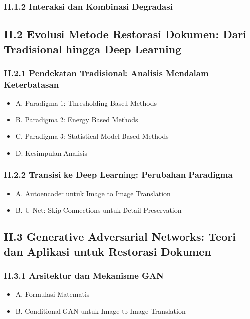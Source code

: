 \documentclass[11pt,a4paper]{article}
\begin{document}
\subsubsection*{II.1.2 Interaksi dan Kombinasi Degradasi}

\vspace{0.5em}

\subsection*{II.2 Evolusi Metode Restorasi Dokumen: Dari Tradisional hingga Deep Learning}

\subsubsection*{II.2.1 Pendekatan Tradisional: Analisis Mendalam Keterbatasan}
\begin{itemize}[label={}, leftmargin=2em]
    \item A. Paradigma 1: Thresholding Based Methods
    \item B. Paradigma 2: Energy Based Methods
    \item C. Paradigma 3: Statistical Model Based Methods
    \item D. Kesimpulan Analisis
\end{itemize}

\subsubsection*{II.2.2 Transisi ke Deep Learning: Perubahan Paradigma}
\begin{itemize}[label={}, leftmargin=2em]
    \item A. Autoencoder untuk Image to Image Translation
    \item B. U-Net: Skip Connections untuk Detail Preservation
\end{itemize}

\vspace{0.5em}

\subsection*{II.3 Generative Adversarial Networks: Teori dan Aplikasi untuk Restorasi Dokumen}

\subsubsection*{II.3.1 Arsitektur dan Mekanisme GAN}
\begin{itemize}[label={}, leftmargin=2em]
    \item A. Formulasi Matematis
    \item B. Conditional GAN untuk Image to Image Translation
\end{itemize}
\end{document}
